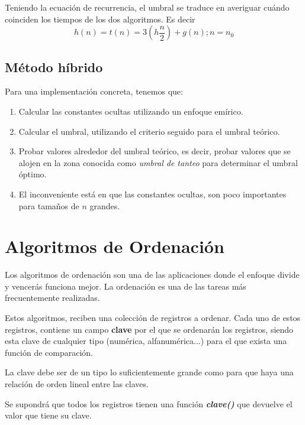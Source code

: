 \documentclass[10pt,a4paper,spanish]{report}
\theoremstyle{definition}
\theoremstyle{remark}
\begin{document}
Teniendo la ecuación de recurrencia, el umbral se traduce en averiguar cuándo coinciden los tiempos de los dos algoritmos. Es decir
\begin{displaymath}
    h(n) = t(n) = 3\left(h\frac{n}{2}\right) + g(n); n = n_0
\end{displaymath}

\subsection{\textcolor[rgb]{0.2,0.5,0.5}Método híbrido}

Para una implementación concreta, tenemos que:

\begin{enumerate}
    \item Calcular las constantes ocultas utilizando un enfoque emírico.
    \item Calcular el umbral, utilizando el criterio seguido para el umbral teórico.
    \item Probar valores alrededor del umbral teórico, es decir, probar valores que se alojen en la zona conocida como \textit{\textcolor[rgb]{0.2,0.5,0.5}{umbral de tanteo}} para determinar el umbral óptimo.
    \item El inconveniente está en que las constantes ocultas, son poco importantes para tamaños de $n$ grandes.
\end{enumerate}

\section{\textcolor[rgb]{0.2,0.5,0.5}Algoritmos de Ordenación}

Los algoritmos de ordenación son una de las aplicaciones donde el enfoque divide y vencerás funciona mejor. La ordenación es una de las tareas más frecuentemente realizadas.

Estos algoritmos, reciben una colección de registros a ordenar. Cada uno de estos registros, contiene un campo \textbf{\textcolor[rgb]{0.2,0.5,0.5}{clave}} por el que se ordenarán los registros, siendo esta clave de cualquier tipo (numérica, alfanumérica...) para el que exista una función de comparación.

La clave debe ser de un tipo lo suficientemente grande como para que haya una relación de orden lineal entre las claves.

Se supondrá que todos los registros tienen una función \textit{\textbf{\textcolor[rgb]{0.2,0.5,0.5}{clave()}}} que devuelve el valor que tiene su clave.
\end{document}
